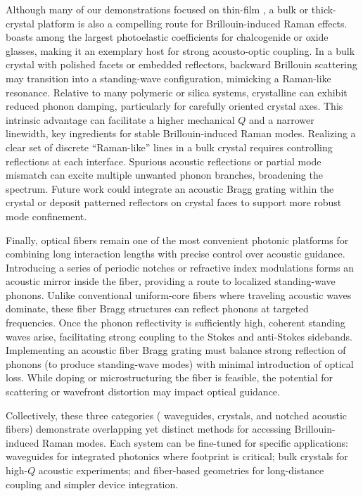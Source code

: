 Although many of our demonstrations focused on thin-film , a bulk or thick-crystal platform is also a compelling route for Brillouin-induced Raman effects.  boasts among the largest photoelastic coefficients for chalcogenide or oxide glasses, making it an exemplary host for strong acousto-optic coupling. In a bulk crystal with polished facets or embedded reflectors, backward Brillouin scattering may transition into a standing-wave configuration, mimicking a Raman-like resonance. Relative to many polymeric or silica systems, crystalline  can exhibit reduced phonon damping, particularly for carefully oriented crystal axes. This intrinsic advantage can facilitate a higher mechanical \(Q\) and a narrower linewidth, key ingredients for stable Brillouin-induced Raman modes. Realizing a clear set of discrete ``Raman-like'' lines in a bulk crystal requires controlling reflections at each interface. Spurious acoustic reflections or partial mode mismatch can excite multiple unwanted phonon branches, broadening the spectrum. Future work could integrate an acoustic Bragg grating within the crystal or deposit patterned reflectors on crystal faces to support more robust mode confinement.

Finally, optical fibers remain one of the most convenient photonic platforms for combining long interaction lengths with precise control over acoustic guidance. Introducing a series of periodic notches or refractive index modulations forms an acoustic mirror inside the fiber, providing a route to localized standing-wave phonons. Unlike conventional uniform-core fibers where traveling acoustic waves dominate, these fiber Bragg structures can reflect phonons at targeted frequencies. Once the phonon reflectivity is sufficiently high, coherent standing waves arise, facilitating strong coupling to the Stokes and anti-Stokes sidebands. Implementing an acoustic fiber Bragg grating must balance strong reflection of phonons (to produce standing-wave modes) with minimal introduction of optical loss. While doping or microstructuring the fiber is feasible, the potential for scattering or wavefront distortion may impact optical guidance.

Collectively, these three categories ( waveguides,  crystals, and notched acoustic fibers) demonstrate overlapping yet distinct methods for accessing Brillouin-induced Raman modes. Each system can be fine-tuned for specific applications:  waveguides for integrated photonics where footprint is critical; bulk crystals for high-\(Q\) acoustic experiments; and fiber-based geometries for long-distance coupling and simpler device integration.

